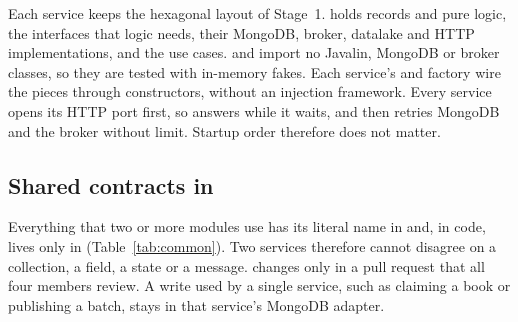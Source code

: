 Each service keeps the hexagonal layout of Stage~1.  holds records and pure logic,  the
interfaces that logic needs,  their MongoDB, broker, datalake and HTTP implementations, and
 the use cases.  and  import no Javalin, MongoDB or broker classes, so they
are tested with in-memory fakes. Each service's  and factory wire the pieces through constructors, without
an injection framework. Every service opens its HTTP port first, so  answers  while it waits,
and then retries MongoDB and the broker without limit. Startup order therefore does not matter.

\subsection{Shared contracts in \texorpdfstring{}{common}}

Everything that two or more modules use has its literal name in  and, in code, lives only in
 (Table~\ref{tab:common}). Two services therefore cannot disagree on a collection, a field, a state or a
message.  changes only in a pull request that all four members review. A write used by a single service,
such as claiming a book or publishing a batch, stays in that service's MongoDB adapter.


